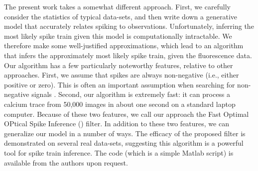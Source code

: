 
The present work takes a somewhat different approach.  First, we carefully consider the statistics of typical data-sets, and then write down a generative model that accurately relates spiking to observations. Unfortunately, inferring the most likely spike train given this model is computationally intractable.  We therefore make some well-justified approximations, which lead to an algorithm that infers the approximately most likely spike train, given the fluorescence data.  Our algorithm has a few particularly noteworthy features, relative to other approaches.  First, we assume that spikes are always non-negative (i.e., either positive or zero).  This is often an important assumption when searching for non-negative signals \cite{LeeSeung99, LeeSeung01, HuysPaninski06}.  Second, our algorithm is extremely fast: it can process a calcium trace from 50,000 images in about one second on a standard laptop computer.  Because of these two features, we call our approach the Fast Optimal OPtical Spike Inference (\foopsi) filter. In addition to these two features, we can generalize our model in a number of ways. The efficacy of the proposed filter is demonstrated on several real data-sets, suggesting this algorithm is a powerful tool for spike train inference.  The code (which is a simple Matlab script) is available from the authors upon request. 
